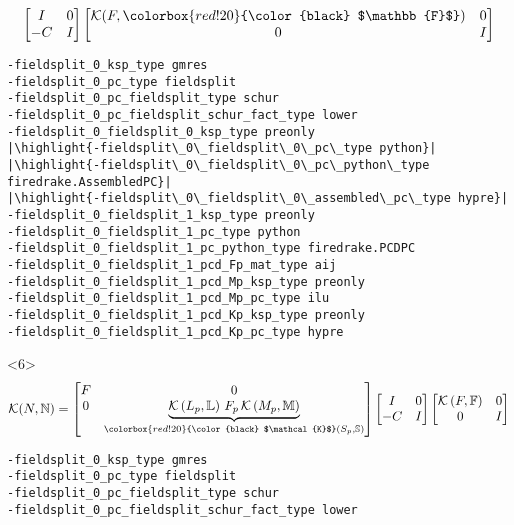 \documentclass[presentation]{beamer}
\newcommand{\KSP}[2]{\ensuremath{\mathcal{K}\left(#1, \mathbb{#2}\right)}}
\newcommand{\ksp}[1]{\KSP{#1}{#1}}
\newcommand{\highlight}[1]{\colorbox{red!20}{\color{black} #1}}
\begin{document}
\begin{frame}[fragile]
\begin{onlyenv}
\begin{equation*}
      \begin{bmatrix}
        I & 0\\
        -C & I
      \end{bmatrix}
      \begin{bmatrix}
        \mathcal{K}(F, \highlight{$\mathbb{F}$}) & 0 \\
        0 & I
      \end{bmatrix}
    \end{equation*}
\begin{verbatim}
-fieldsplit_0_ksp_type gmres
-fieldsplit_0_pc_type fieldsplit
-fieldsplit_0_pc_fieldsplit_type schur
-fieldsplit_0_pc_fieldsplit_schur_fact_type lower
-fieldsplit_0_fieldsplit_0_ksp_type preonly
|\highlight{-fieldsplit\_0\_fieldsplit\_0\_pc\_type python}|
|\highlight{-fieldsplit\_0\_fieldsplit\_0\_pc\_python\_type firedrake.AssembledPC}|
|\highlight{-fieldsplit\_0\_fieldsplit\_0\_assembled\_pc\_type hypre}|
-fieldsplit_0_fieldsplit_1_ksp_type preonly
-fieldsplit_0_fieldsplit_1_pc_type python
-fieldsplit_0_fieldsplit_1_pc_python_type firedrake.PCDPC
-fieldsplit_0_fieldsplit_1_pcd_Fp_mat_type aij
-fieldsplit_0_fieldsplit_1_pcd_Mp_ksp_type preonly
-fieldsplit_0_fieldsplit_1_pcd_Mp_pc_type ilu
-fieldsplit_0_fieldsplit_1_pcd_Kp_ksp_type preonly
-fieldsplit_0_fieldsplit_1_pcd_Kp_pc_type hypre
\end{verbatim}
  \end{onlyenv}
  \begin{onlyenv}<6>
    \color{gray}
    \begin{equation*}
      \mathcal{K}(N, \mathbb{N}) = \begin{bmatrix}
        F & 0 \\
        0 & \underbrace{\KSP{L_p}{L}\,F_p \,
          \KSP{M_p}{M}}_{\highlight{$\mathcal{K}$}(S_p, \mathbb{S})}
      \end{bmatrix}
      \begin{bmatrix}
        I & 0\\
        -C & I
      \end{bmatrix}
      \begin{bmatrix}
        \ksp{F} & 0 \\
        0 & I
      \end{bmatrix}
    \end{equation*}
\begin{verbatim}
-fieldsplit_0_ksp_type gmres
-fieldsplit_0_pc_type fieldsplit
-fieldsplit_0_pc_fieldsplit_type schur
-fieldsplit_0_pc_fieldsplit_schur_fact_type lower

\end{verbatim}
\end{onlyenv}
\end{frame}
\end{document}
